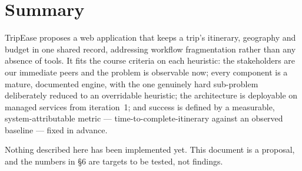 \documentclass[11pt,a4paper]{article}
\begin{document}
\section{Summary}
TripEase proposes a web application that keeps a
trip's itinerary, geography and budget in one shared
record, addressing workflow fragmentation rather than
any absence of tools. It fits the course criteria on
each heuristic: the stakeholders are our immediate
peers and the problem is observable now; every
component is a mature, documented engine, with the one
genuinely hard sub-problem deliberately reduced to an
overridable heuristic; the architecture is deployable
on managed services from iteration~1; and success is
defined by a measurable, system-attributable metric
--- time-to-complete-itinerary against an observed
baseline --- fixed in advance.

Nothing described here has been implemented yet. This
document is a proposal, and the numbers in \S6 are
targets to be tested, not findings.
\end{document}

